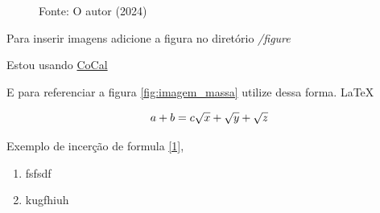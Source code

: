 \begin{figure}[H]

  \raggedright
  {\fontsize{10pt}{\baselineskip}\selectfont Fonte: O autor (2024)}
  \label{fig:ap1_cod_vigual1}
\end{figure}




Para inserir imagens adicione a figura no diretório \textit{/figure}


\par Estou usando \href {https://cocalc.com/} {CoCal}

E para referenciar a figura \ref{fig:imagem_massa} utilize dessa forma. \LaTeX

\begin{equation}
  a + b = c \label{1}
  $$ $$ %
  \sqrt{x} + \sqrt{\smash[b]{y}} + \sqrt{z}
\end{equation}


\par Exemplo de incerção de formula \eqref{1},





\begin{enumerate}[label=\Roman{*}, ref=(\roman{*})]
  \item fsfsdf
  \item kugfhiuh
\end{enumerate}

